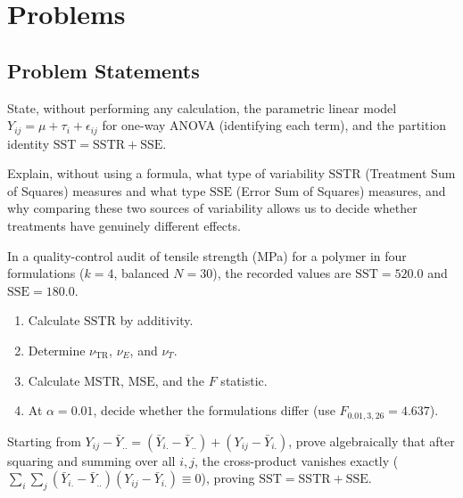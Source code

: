 \section*{Problems}

\subsection*{Problem Statements}

\begin{problema}
\label{prob:04f6e1c}
State, without performing any calculation, the parametric linear model $Y_{ij}=\mu+\tau_i+\epsilon_{ij}$ for one-way ANOVA (identifying each term), and the partition identity $\text{SST}=\text{SSTR}+\text{SSE}$.
\end{problema}

\begin{problema}
\label{prob:e3fdc51}
Explain, without using a formula, what type of variability $\text{SSTR}$ (Treatment Sum of Squares) measures and what type $\text{SSE}$ (Error Sum of Squares) measures, and why comparing these two sources of variability allows us to decide whether treatments have genuinely different effects.
\end{problema}

\begin{problema}
\label{prob:2b1379c}
In a quality-control audit of tensile strength (MPa) for a polymer in four formulations ($k=4$, balanced $N=30$), the recorded values are $\text{SST}=520.0$ and $\text{SSE}=180.0$.
\begin{enumerate}
\item Calculate $\text{SSTR}$ by additivity.
\item Determine $\nu_{\text{TR}}$, $\nu_E$, and $\nu_T$.
\item Calculate $\text{MSTR}$, $\text{MSE}$, and the $F$ statistic.
\item At $\alpha=0.01$, decide whether the formulations differ (use $F_{0.01,3,26}=4.637$).
\end{enumerate}
\end{problema}

\begin{problema}
\label{prob:614e799}
Starting from $Y_{ij}-\bar Y_{..} = (\bar Y_{i.}-\bar Y_{..})+(Y_{ij}-\bar Y_{i.})$, prove algebraically that after squaring and summing over all $i,j$, the cross-product vanishes exactly ($\sum_i\sum_j(\bar Y_{i.}-\bar Y_{..})(Y_{ij}-\bar Y_{i.})\equiv0$), proving $\text{SST}=\text{SSTR}+\text{SSE}$.
\end{problema}

